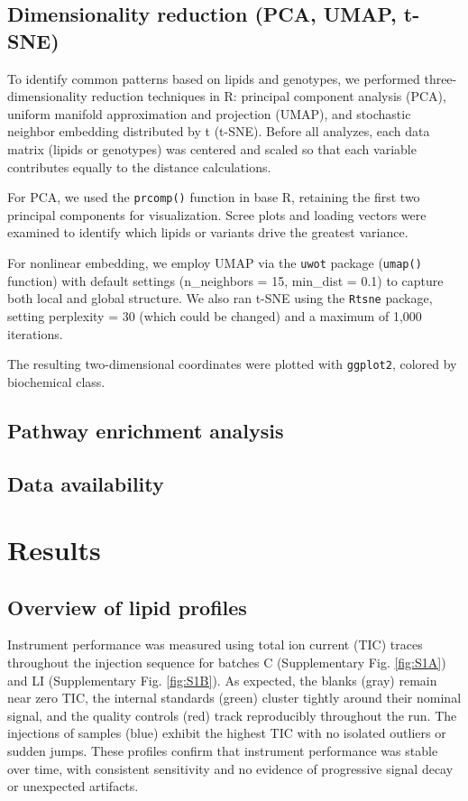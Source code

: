 \documentclass[10pt,letterpaper]{article}
\begin{document}
\subsection*{Dimensionality reduction (PCA, UMAP, t-SNE)}  
To identify common patterns based on lipids and genotypes, we performed three-dimensionality reduction techniques in R: principal component analysis (PCA), uniform manifold approximation and projection (UMAP), and stochastic neighbor embedding distributed by t (t-SNE).  Before all analyzes, each data matrix (lipids or genotypes) was centered and scaled so that each variable contributes equally to the distance calculations.

For PCA, we used the \texttt{prcomp()} function in base R, retaining the first two principal components for visualization.  Scree plots and loading vectors were examined to identify which lipids or variants drive the greatest variance.  

For nonlinear embedding, we employ UMAP via the \texttt{uwot} package (\texttt{umap()} function) with default settings (n\_neighbors = 15, min\_dist = 0.1) to capture both local and global structure.  We also ran t-SNE using the \texttt{Rtsne} package, setting perplexity = 30 (which could be changed) and a maximum of 1,000 iterations.  

The resulting two-dimensional coordinates were plotted with \texttt{ggplot2}, colored by biochemical class.

\subsection*{Pathway enrichment analysis}

\subsection*{Data availability}



\section*{Results}

\subsection*{Overview of lipid profiles}

Instrument performance was measured using total ion current (TIC) traces throughout the injection sequence for batches C (Supplementary Fig. \ref{fig:S1A}) and LI (Supplementary Fig. \ref{fig:S1B}). As expected, the blanks (gray) remain near zero TIC, the internal standards (green) cluster tightly around their nominal signal, and the quality controls (red) track reproducibly throughout the run. The injections of samples (blue) exhibit the highest TIC with no isolated outliers or sudden jumps. These profiles confirm that instrument performance was stable over time, with consistent sensitivity and no evidence of progressive signal decay or unexpected artifacts.
\end{document}
